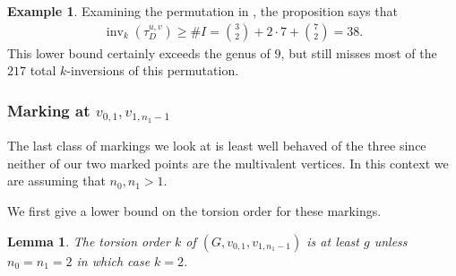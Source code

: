 \documentclass[11pt]{article}
\newtheorem{lemma}[theo]{Lemma}
\theoremstyle{definition}
\newtheorem{example}[theo]{Example}
\numberwithin{equation}{section}
\newcommand{\inv}{\operatorname{inv}}
\newcommand{\tauD}{\tau^{u,v}_D}
\begin{document}
\begin{example}
    Examining the permutation in , the proposition says that
\begin{align*}
    \inv_k(\tauD) \geq \#I = \binom{3}{2} + 2\cdot 7 + \binom{7}{2} = 38.
\end{align*}
This lower bound certainly exceeds the genus of $9$, but still misses most of the $217$ total $k$-inversions of this permutation.
\end{example}


\subsubsection{\texorpdfstring{Marking at $v_{0,1},v_{1,n_1-1}$}{Marking at v\_0,1 and v\_1,n1-1}}\label{subsub-bothOff}
The last class of markings we look at is least well behaved of the three since neither of our two marked points are the multivalent vertices. In this context we are assuming that $n_0,n_1>1$.

We first give a lower bound on the torsion order for these markings.
\begin{lemma}\label{lem-bothOffTorOrder}
    The torsion order $k$ of $(G,v_{0,1},v_{1,n_1-1})$ is at least $g$ unless $n_0 = n_1 = 2$ in which case $k = 2$.
\end{lemma}
\end{document}
